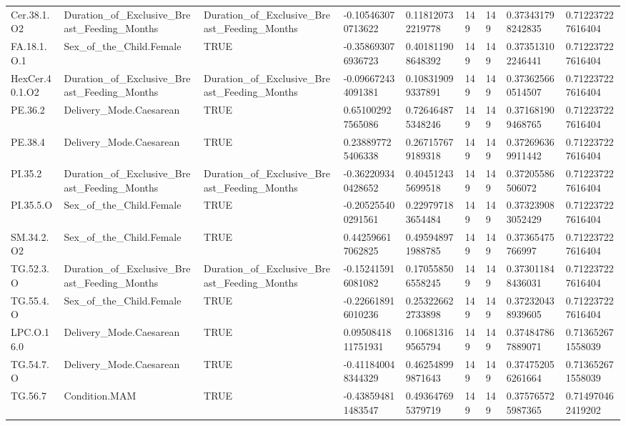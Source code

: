 \begin{longtable}{lllllllll}
Cer.38.1.O2 & Duration\_of\_Exclusive\_Breast\_Feeding\_Months & Duration\_of\_Exclusive\_Breast\_Feeding\_Months & -0.105463070713622 & 0.118120732219778 & 149 & 149 & 0.373431798242835 & 0.712237227616404 \\
FA.18.1.O.1 & Sex\_of\_the\_Child.Female & TRUE & -0.358693076936723 & 0.401811908648392 & 149 & 149 & 0.373513102246441 & 0.712237227616404 \\
HexCer.40.1.O2 & Duration\_of\_Exclusive\_Breast\_Feeding\_Months & Duration\_of\_Exclusive\_Breast\_Feeding\_Months & -0.096672434091381 & 0.108319099337891 & 149 & 149 & 0.373625660514507 & 0.712237227616404 \\
PE.36.2 & Delivery\_Mode.Caesarean & TRUE & 0.651002927565086 & 0.726464875348246 & 149 & 149 & 0.371681909468765 & 0.712237227616404 \\
PE.38.4 & Delivery\_Mode.Caesarean & TRUE & 0.238897725406338 & 0.267157679189318 & 149 & 149 & 0.372696369911442 & 0.712237227616404 \\
PI.35.2 & Duration\_of\_Exclusive\_Breast\_Feeding\_Months & Duration\_of\_Exclusive\_Breast\_Feeding\_Months & -0.362209340428652 & 0.404512435699518 & 149 & 149 & 0.37205586506072 & 0.712237227616404 \\
PI.35.5.O & Sex\_of\_the\_Child.Female & TRUE & -0.205255400291561 & 0.229797183654484 & 149 & 149 & 0.373239083052429 & 0.712237227616404 \\
SM.34.2.O2 & Sex\_of\_the\_Child.Female & TRUE & 0.442596617062825 & 0.495948971988785 & 149 & 149 & 0.37365475766997 & 0.712237227616404 \\
TG.52.3.O & Duration\_of\_Exclusive\_Breast\_Feeding\_Months & Duration\_of\_Exclusive\_Breast\_Feeding\_Months & -0.152415916081082 & 0.170558506558245 & 149 & 149 & 0.373011848436031 & 0.712237227616404 \\
TG.55.4.O & Sex\_of\_the\_Child.Female & TRUE & -0.226618916010236 & 0.253226622733898 & 149 & 149 & 0.372320438939605 & 0.712237227616404 \\
LPC.O.16.0 & Delivery\_Mode.Caesarean & TRUE & 0.0950841811751931 & 0.106813169565794 & 149 & 149 & 0.374847867889071 & 0.713652671558039 \\
TG.54.7.O & Delivery\_Mode.Caesarean & TRUE & -0.411840048344329 & 0.462548999871643 & 149 & 149 & 0.374752056261664 & 0.713652671558039 \\
TG.56.7 & Condition.MAM & TRUE & -0.438594811483547 & 0.493647695379719 & 149 & 149 & 0.375765725987365 & 0.714970462419202 \\

\end{longtable}

